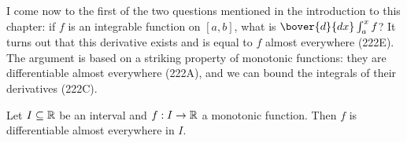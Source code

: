 


\def\chaptername{The Fundamental Theorem of Calculus}
\def\sectionname{Differentiating an indefinite integral}
     
     
I come now to the first of the two questions mentioned in the
introduction to this chapter:  if $f$ is an integrable function on
$[a,b]$, what is $\bover{d}{dx}\int_a^xf$?   It turns out that this
derivative exists and is equal to $f$ almost everywhere (222E).   The
argument is based on a striking property of monotonic functions:  they
are differentiable almost everywhere (222A), and we can bound the
integrals of their derivatives (222C).
     
 Let $I\subseteq\Bbb R$ be an interval and
$f:I\to\Bbb R$ a monotonic function.   Then $f$ is differentiable almost 
everywhere in $I$.
     
     
